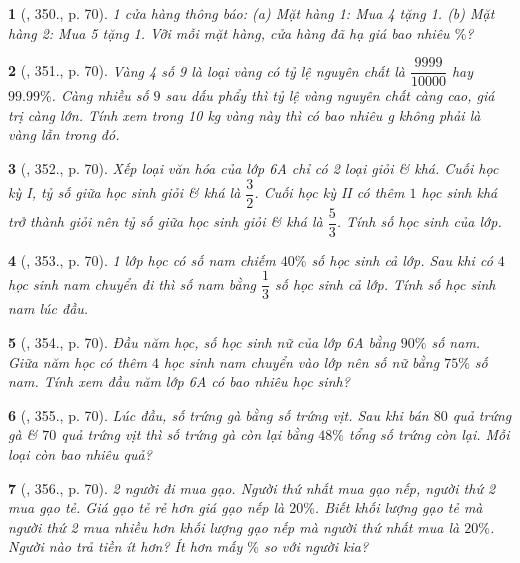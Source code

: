 \documentclass{article}
\newtheorem{baitoan}{}
\begin{document}
\begin{baitoan}[\cite{Tuyen_Toan_6}, 350., p. 70]
	1 cửa hàng thông báo: (a) Mặt hàng 1: Mua 4 tặng 1. (b) Mặt hàng 2: Mua 5 tặng 1. Vỡi mỗi mặt hàng, cửa hàng đã hạ giá bao nhiêu $\%$?
\end{baitoan}

\begin{baitoan}[\cite{Tuyen_Toan_6}, 351., p. 70]
	Vàng 4 số 9 là loại vàng có tỷ lệ nguyên chất là $\dfrac{9999}{10000}$ hay $99.99\%$. Càng nhiều số $9$ sau dấu phẩy thì tỷ lệ vàng nguyên chất càng cao, giá trị càng lớn. Tính xem trong {\rm10 kg} vàng này thì có bao nhiêu {\rm g} không phải là vàng lẫn trong đó.
\end{baitoan}

\begin{baitoan}[\cite{Tuyen_Toan_6}, 352., p. 70]
	Xếp loại văn hóa của lớp 6A chỉ có 2 loại giỏi \& khá. Cuối học kỳ I, tỷ số giữa học sinh giỏi \& khá là $\dfrac{3}{2}$. Cuối học kỳ II có thêm $1$ học sinh khá trở thành giỏi nên tỷ số giữa học sinh giỏi \& khá là $\dfrac{5}{3}$. Tính số học sinh của lớp.
\end{baitoan}

\begin{baitoan}[\cite{Tuyen_Toan_6}, 353., p. 70]
	1 lớp học có số nam chiếm $40\%$ số học sinh cả lớp. Sau khi có $4$ học sinh nam chuyển đi thì số nam bằng $\dfrac{1}{3}$ số học sinh cả lớp. Tính số học sinh nam lúc đầu.
\end{baitoan}

\begin{baitoan}[\cite{Tuyen_Toan_6}, 354., p. 70]
	Đầu năm học, số học sinh nữ của lớp 6A bằng $90\%$ số nam. Giữa năm học có thêm $4$ học sinh nam chuyển vào lớp nên số nữ bằng $75\%$ số nam. Tính xem đầu năm lớp 6A có bao nhiêu học sinh?
\end{baitoan}

\begin{baitoan}[\cite{Tuyen_Toan_6}, 355., p. 70]
	Lúc đầu, số trứng gà bằng số trứng vịt. Sau khi bán $80$ quả trứng gà \& $70$ quả trứng vịt thì số trứng gà còn lại bằng $48\%$ tổng số trứng còn lại. Mỗi loại còn bao nhiêu quả?
\end{baitoan}

\begin{baitoan}[\cite{Tuyen_Toan_6}, 356., p. 70]
	2 người đi mua gạo. Người thứ nhất mua gạo nếp, người thứ 2 mua gạo tẻ. Giá gạo tẻ rẻ hơn giá gạo nếp là $20\%$. Biết khối lượng gạo tẻ mà người thứ 2 mua nhiều hơn khối lượng gạo nếp mà người thứ nhất mua là $20\%$. Người nào trả tiền ít hơn? Ít hơn mấy $\%$ so với người kia?
\end{baitoan}
\end{document}

